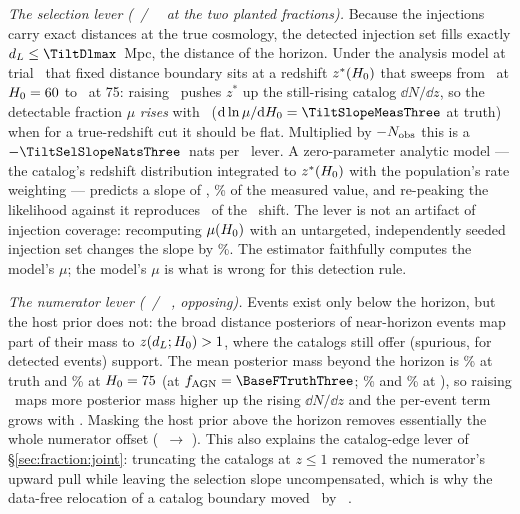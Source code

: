 \emph{The selection lever
(\BaseDecompShiftThree\ / \BaseDecompShiftSeven~\kmsmpc\ at the two planted
fractions).} Because the injections carry exact distances at the true
cosmology, the detected injection set fills exactly
$d_L \le \TiltDlmax$~Mpc, the distance of the horizon. Under the analysis
model at trial \Hz\ that fixed distance boundary sits at a redshift
$z^*(H_0)$ that sweeps from \TiltZstarLo\ at $H_0 = 60$ to \TiltZstarHi\ at
75: raising \Hz\ pushes $z^*$ up the still-rising catalog $\dd N/\dd z$, so
the detectable fraction $\mu$ \emph{rises} with \Hz\
($\dd\ln\mu/\dd\Hz = \TiltSlopeMeasThree$ at truth) when for a true-redshift
cut it should be flat. Multiplied by $-N_{\rm obs}$ this is a
$-\TiltSelSlopeNatsThree$~nats per \kmsmpc\ lever. A zero-parameter analytic
model --- the catalog's redshift distribution integrated to $z^*(H_0)$ with
the population's rate weighting --- predicts a slope of \TiltSlopeModelThree,
\TiltModelPct\% of the measured value, and re-peaking the likelihood against
it reproduces \TiltPredShiftThree\ of the \BaseDecompShiftThree\ shift. The
lever is not an artifact of injection coverage: recomputing $\mu(H_0)$ with an
untargeted, independently seeded injection set changes the slope by
\TiltSlopeDiffPct\%. The estimator faithfully computes the model's $\mu$; the
model's $\mu$ is what is wrong for this detection rule.

\emph{The numerator lever (\TiltNumLeakThree\ / \TiltNumLeakSeven~\kmsmpc,
opposing).} Events exist only below the horizon, but the host prior does not:
the broad distance posteriors of near-horizon events map part of their mass to
$z(d_L; H_0) > 1$, where the catalogs still offer (spurious, for detected
events) support. The mean posterior mass beyond the horizon is
\TiltLeakTruthThree\% at truth and \TiltLeakHighThree\% at $H_0 = 75$ (at
$\fagn = \BaseFTruthThree$; \TiltLeakTruthSeven\% and \TiltLeakHighSeven\% at
\BaseFTruthSeven), so raising \Hz\ maps more posterior mass higher up the
rising $\dd N/\dd z$ and the per-event term grows with \Hz. Masking the host
prior above the horizon removes essentially the whole numerator offset
(\BaseDecompNumOffThree\ $\rightarrow$ \TiltRepairOffThree). This also
explains the catalog-edge lever of \S\ref{sec:fraction:joint}: truncating the
catalogs at $z \le 1$ removed the numerator's upward pull while leaving the
selection slope uncompensated, which is why the data-free relocation of a
catalog boundary moved \Hz\ by \BaseEdgeShiftThree~\kmsmpc.

